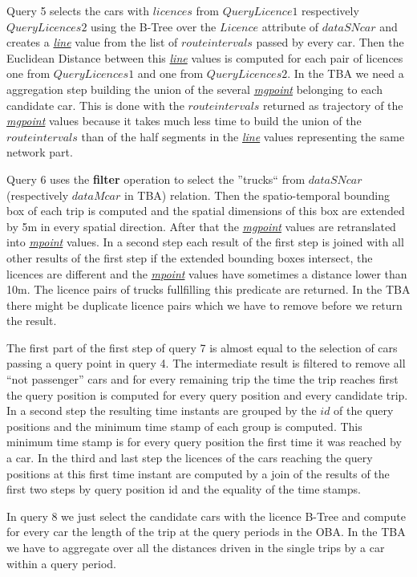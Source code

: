 \documentclass[a4paper]{article}
\newcommand{\op}[1]{\textbf{#1}}
\newcommand{\dt}[1]{\textsl{\underline{#1}}}
\begin{document}
Query 5 selects the cars with $licences$ from $QueryLicence1$ respectively
$QueryLicences2$  using the B-Tree over the $Licence$ attribute of $dataSNcar$
and creates a \dt{line} value  from the list of $route intervals$ passed by
every car. Then the Euclidean Distance between this \dt{line} values is computed
for each pair of licences one from $QueryLicences1$ and one  from $QueryLicences2$.
In the TBA we need a aggregation step building the union of the several
\dt{mgpoint} belonging to each candidate car. This is done with the $route intervals$
returned as trajectory of the \dt{mgpoint} values because it takes much less
time to build the union of the $route intervals$ than of the half segments
in the \dt{line} values representing the same network part.

Query 6 uses the \op{filter} operation to select the ''trucks`` from $dataSNcar$
(respectively $dataMcar$ in TBA) relation. Then the spatio-temporal bounding box of
each trip is computed and the spatial dimensions of this box are extended by 5m in
every spatial direction. After that the \dt{mgpoint} values are retranslated into
\dt{mpoint} values. In a second step each result of the first step is joined with
all other results of the first step if the extended bounding boxes intersect, the
licences are different and the \dt{mpoint} values have sometimes a distance lower
than 10m. The licence pairs of trucks fullfilling this predicate are returned. In
the TBA there might be duplicate licence pairs which we have to remove before we
return the result.

The first part of the first step of query 7 is almost equal to the selection of cars
passing a query point in query 4. The intermediate result is filtered to remove all
``not passenger'' cars and for every remaining trip the time the trip reaches first
the query position is computed for every query position and every candidate trip. In
a second step the resulting time instants are grouped by the $id$ of the query
positions and the minimum time stamp of each group is computed. This minimum time
stamp is for every query position the first time it was reached by a car. In the
third and last step the licences of the cars reaching the query positions at this
first time instant are computed by a join of the results of the first two steps by
query position id and the equality of the time stamps.

In query 8 we just select the candidate cars with the licence B-Tree and compute for
every car the length of the trip at the query periods in the OBA. In the TBA we have
to aggregate over all the distances driven in the single trips by a car within a
query period.
\end{document}
